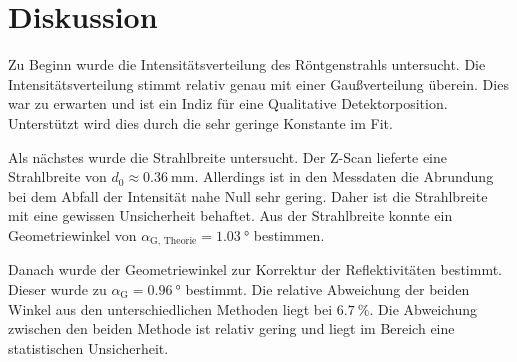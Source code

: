 \chapter{Diskussion}
\label{cha:Diskussion}
Zu Beginn wurde die Intensitätsverteilung des Röntgenstrahls untersucht. Die Intensitätsverteilung stimmt relativ genau mit einer Gaußverteilung überein. Dies war zu erwarten und 
ist ein Indiz für eine Qualitative Detektorposition. Unterstützt wird dies durch die sehr geringe Konstante im Fit. 

Als nächstes wurde die Strahlbreite untersucht. Der Z-Scan lieferte eine Strahlbreite von $d_0 \approx \qty{0.36}{\milli\metre}$. Allerdings ist in den Messdaten die Abrundung bei 
dem Abfall der Intensität nahe Null sehr gering. Daher ist die Strahlbreite mit eine gewissen Unsicherheit behaftet. Aus der Strahlbreite konnte ein Geometriewinkel von 
$\alpha_\text{G, Theorie} = \qty{1.03}{\degree}$ bestimmen.

Danach wurde der Geometriewinkel zur Korrektur der Reflektivitäten bestimmt. Dieser wurde zu $\alpha_\text{G} = \qty{0.96}{\degree}$ bestimmt. Die relative Abweichung der beiden Winkel 
aus den unterschiedlichen Methoden liegt bei $\qty{6.7}{\percent}$. Die Abweichung zwischen den beiden Methode ist relativ gering und liegt im Bereich eine statistischen Unsicherheit.
